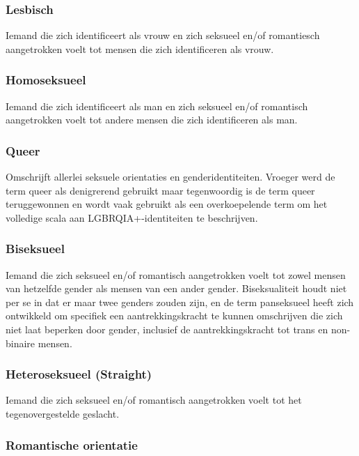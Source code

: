 \documentclass[12pt,openany]{book}
\begin{document}
\subsubsection*{Lesbisch}

Iemand die zich identificeert als vrouw en zich seksueel en/of romantiesch aangetrokken voelt tot mensen die zich identificeren als vrouw.

\subsubsection*{Homoseksueel}

Iemand die zich identificeert als man en zich seksueel en/of romantisch aangetrokken voelt tot andere mensen die zich identificeren als man.

\subsubsection*{Queer}

Omschrijft allerlei seksuele orientaties en genderidentiteiten. Vroeger werd de term queer als denigrerend gebruikt maar tegenwoordig is de term queer teruggewonnen en wordt vaak gebruikt als een overkoepelende term om het volledige scala aan LGBRQIA+-identiteiten te beschrijven.  

\subsubsection*{Biseksueel}

Iemand die zich seksueel en/of romantisch aangetrokken voelt tot zowel mensen van hetzelfde gender als mensen van een ander gender. Biseksualiteit houdt niet per se in dat er maar twee genders zouden zijn, en de term panseksueel heeft zich ontwikkeld om specifiek een aantrekkingskracht te kunnen omschrijven die zich niet laat beperken door gender, inclusief de aantrekkingskracht tot trans en non-binaire mensen.

\subsubsection*{Heteroseksueel (Straight)}

Iemand die zich seksueel en/of romantisch aangetrokken voelt tot het tegenovergestelde geslacht.

\subsubsection*{Romantische orientatie}
\end{document}
